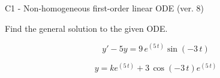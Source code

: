 \begin{exercise}
  \begin{exerciseTitle}C1 - Non-homogeneous first-order linear ODE (ver. 8)\end{exerciseTitle}
  \begin{exerciseStatement}
    
Find the general solution to the given ODE.

    
\[y'-5y= 9 \, e^{\left(5 \, t\right)} \sin\left(-3 \, t\right)\]

  \end{exerciseStatement}
  \begin{exerciseAnswer}
    
\[y= k e^{\left(5 \, t\right)} + 3 \, \cos\left(-3 \, t\right) e^{\left(5 \, t\right)}\]

  \end{exerciseAnswer}
\end{exercise}